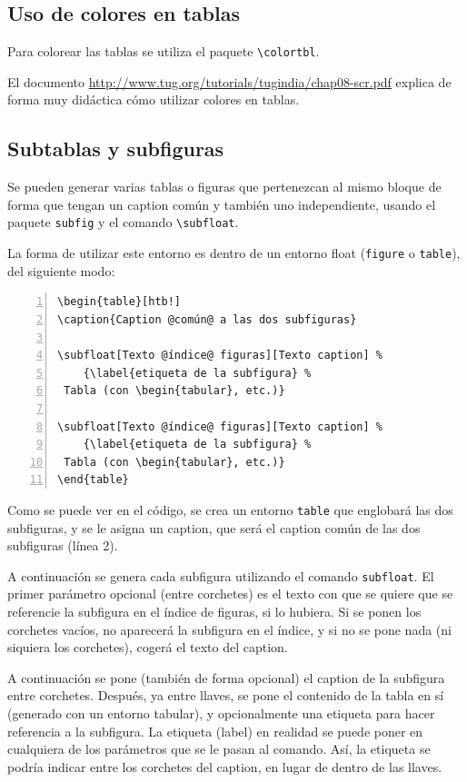 \documentclass[12pt,a4paper, oneside]{report}
\begin{document}
\subsection{Uso de colores en tablas}

Para colorear las tablas se utiliza el paquete \verb+\colortbl+.

El documento \url{http://www.tug.org/tutorials/tugindia/chap08-scr.pdf} explica
de forma muy didáctica cómo utilizar colores en tablas.

\clearpage
\subsection{Subtablas y subfiguras}

Se pueden generar varias tablas o figuras que pertenezcan al mismo bloque de
forma que tengan un caption común y también uno independiente, usando el paquete
\verb+subfig+ y el comando \verb+\subfloat+.

La forma de utilizar este entorno es dentro de un entorno float (\verb+figure+ o
\verb+table+), del siguiente modo:

\begin{lstlisting}[numbers=left]
\begin{table}[htb!]
\caption{Caption @común@ a las dos subfiguras}

\subfloat[Texto @índice@ figuras][Texto caption] %
    {\label{etiqueta de la subfigura} %
 Tabla (con \begin{tabular}, etc.)}

\subfloat[Texto @índice@ figuras][Texto caption] %
    {\label{etiqueta de la subfigura} %
 Tabla (con \begin{tabular}, etc.)}
\end{table}
\end{lstlisting}

Como se puede ver en el código, se crea un entorno \verb+table+ que englobará
las dos subfiguras, y se le asigna un caption, que será el caption común de las
dos subfiguras (línea 2). 

A continuación se genera cada subfigura utilizando el comando \verb+subfloat+.
El primer parámetro opcional (entre corchetes) es el texto con que se quiere
que  se referencie la subfigura en el índice de figuras, si lo hubiera. 
Si se ponen los corchetes vacíos, no aparecerá la subfigura en el índice, y
si no se pone  nada (ni siquiera los corchetes), cogerá el texto del caption.

A continuación se pone (también de forma opcional) el caption de la subfigura
entre corchetes. Después, ya entre llaves, se pone el contenido de la tabla en
sí (generado con un entorno tabular), y opcionalmente una etiqueta para hacer
referencia a la subfigura. La etiqueta (label) en realidad se puede poner en
cualquiera de los parámetros que se le pasan al comando. Así, la etiqueta se
podría indicar entre los corchetes del caption, en lugar de dentro de las
llaves.
\end{document}
